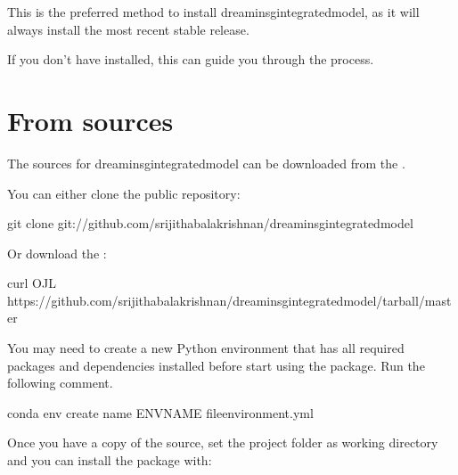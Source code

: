 \documentclass[letterpaper,12pt,english]{sphinxmanual}
\begin{document}
\sphinxAtStartPar
This is the preferred method to install dreaminsg\sphinxhyphen{}integrated\sphinxhyphen{}model, as it will always install the most recent stable release.

\sphinxAtStartPar
If you don’t have  installed, this  can guide
you through the process.
\fi

\section{From sources}
\label{\detokenize{index:from-sources}}
\sphinxAtStartPar
The sources for dreaminsg\sphinxhyphen{}integrated\sphinxhyphen{}model can be downloaded from the .

\sphinxAtStartPar
You can either clone the public repository:

\begin{sphinxVerbatim}[commandchars=\\\{\}]
git clone git://github.com/srijithabalakrishnan/dreaminsg\PYGZus{}integrated\PYGZus{}model
\end{sphinxVerbatim}

\sphinxAtStartPar
Or download the :

\begin{sphinxVerbatim}[commandchars=\\\{\}]
curl \PYGZhy{}OJL https://github.com/srijithabalakrishnan/dreaminsg\PYGZus{}integrated\PYGZus{}model/tarball/master
\end{sphinxVerbatim}

\sphinxAtStartPar
You may need to create a new Python environment that has all required packages and dependencies installed before start using the package.
Run the following comment.

\begin{sphinxVerbatim}[commandchars=\\\{\}]
conda env create \PYGZhy{}\PYGZhy{}name ENV\PYGZus{}NAME \PYGZhy{}\PYGZhy{}fileenvironment.yml
\end{sphinxVerbatim}

\sphinxAtStartPar
Once you have a copy of the source, set the project folder as working directory and you can install the package with:
\end{document}
